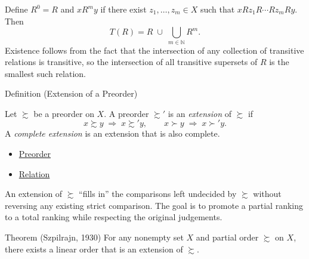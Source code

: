 \begin{remark*}
Define $R^0 = R$ and $xR^m y$ if there exist $z_1, \ldots, z_m \in X$ such
that $xRz_1 R \cdots R z_m Ry$. Then
\[
  T(R) = R \;\cup\; \bigcup_{m \in \mathbb{N}} R^m.
\]
Existence follows from the fact that the intersection of any collection of
transitive relations is transitive, so the intersection of all transitive
supersets of $R$ is the smallest such relation.
\end{remark*}

\begin{definitionbox}{Definition (Extension of a Preorder)}
\begin{definition}\label{def:preorder-extension}
Let $\succsim$ be a preorder on $X$. A preorder $\succsim'$ is an
\emph{extension} of $\succsim$ if
\[
  x \succsim y \;\Rightarrow\; x \succsim' y,
  \qquad
  x \succ y \;\Rightarrow\; x \succ' y.
\]
A \emph{complete extension} is an extension that is also complete.
\end{definition}
\end{definitionbox}

\begin{dependencies}
\begin{itemize}
  \item \hyperref[def:preorder]{Preorder}
  \item \hyperref[def:relation]{Relation}
\end{itemize}
\end{dependencies}

\begin{remark*}
An extension of $\succsim$ ``fills in'' the comparisons left undecided by
$\succsim$ without reversing any existing strict comparison. The goal is to
promote a partial ranking to a total ranking while respecting the original
judgements.
\end{remark*}

\begin{theorembox}{Theorem (Szpilrajn, 1930)}
\label{thm:szpilrajn}
For any nonempty set $X$ and partial order $\succsim$ on $X$, there exists a
linear order that is an extension of $\succsim$.
\end{theorembox}

